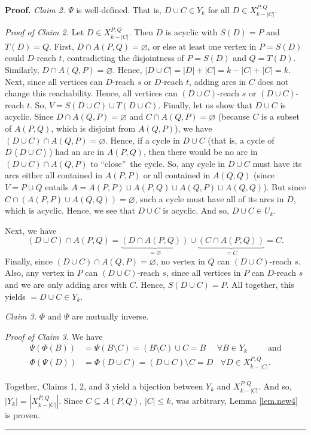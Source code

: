 \documentclass[numbers=enddot,12pt,final,onecolumn,notitlepage]{scrartcl}%
\theoremstyle{definition}
\newenvironment{proof}[1][Proof]{\noindent\textbf{#1.} }{\ \rule{0.5em}{0.5em}}
\theoremstyle{plainsl}
\begin{document}
\begin{proof}
\bigskip
\textit{Claim 2.} $\Psi$ is well-defined. That is, $D \cup C \in Y_{k}$ for all $D \in X_{k-|C|}^{P,Q}$.

\smallskip
\textit{Proof of Claim 2.} Let $D \in X_{k-|C|}^{P,Q}$. Then $D$ is acyclic with $S(D) = P$ and $T(D) = Q$.  First, $D \cap A(P,Q) = \varnothing$, or else at least one vertex in $P = S(D)$ could $D$-reach $t$, contradicting the disjointness of $P = S(D)$ and $Q = T(D)$. Similarly, $D \cap A(Q,P) = \varnothing$. Hence, $|D \cup C| = |D| + |C| = k-|C|+|C| = k$. Next, since all vertices can $D$-reach $s$ or $D$-reach $t$, adding arcs in $C$ does not change this reachability. Hence, all vertices can $(D \cup C)$-reach $s$ or $(D \cup C)$-reach $t$. So, $V = S(D \cup C) \cup T(D \cup C)$. Finally, let us show that $D \cup C$ is acyclic. Since $D \cap A(Q,P) = \varnothing$ and $C \cap A(Q,P) = \varnothing$ (because $C$ is a subset of $A(P,Q)$, which is disjoint from $A(Q,P)$), we have $(D \cup C) \cap A(Q,P) = \varnothing$.
Hence, if a cycle in $D \cup C$ (that is, a cycle of $D\left<D\cup C\right>$) had an arc in $A(P,Q)$, then there would be no arc in $(D \cup C) \cap A(Q,P)$ to ``close''\ the cycle. 
So, any cycle in $D \cup C$ must have its arcs either all contained in $A(P,P)$ or all contained in $A(Q,Q)$ (since $V = P \sqcup Q$ entails $A = A(P,P) \sqcup A(P,Q) \sqcup A(Q,P) \sqcup A(Q,Q)$). But since $C \cap (A(P,P) \cup A(Q,Q)) = \varnothing$, such a cycle must have all of its arcs in $D$, which is acyclic. Hence, we see that $D \cup C$ is acyclic. And so, $D \cup C \in U_{k}$.

Next, we have \begin{equation*}
    (D \cup C) \cap A(P,Q) = \underbrace{(D \cap A(P,Q))}_{=\varnothing} \cup \underbrace{(C \cap A(P,Q))}_{=C} = C.
\end{equation*} Finally, since $(D \cup C) \cap A(Q,P) = \varnothing$, no vertex in $Q$ can $(D \cup C)$-reach $s$. Also, any vertex in $P$ can $(D \cup C)$-reach $s$, since all vertices in $P$ can $D$-reach $s$ and we are only adding arcs with $C$. Hence, $S(D\cup C)= P$. All together, this yields $= D \cup C \in Y_{k}$.

\bigskip
\textit{Claim 3.} $\Phi$ and $\Psi$ are mutually inverse.

\smallskip
\textit{Proof of Claim 3.} We have \begin{align*}
    \Psi(\Phi(B)) &= \Psi(B \setminus C) = (B \setminus C) \cup C = B \ \ \ \ \ \  \forall B \in Y_{k} \ \ \ \ \ \ \ \ \ \ \ \text{and} \\
    \Phi(\Psi(D)) &= \Phi(D \cup C) = (D \cup C) \setminus C = D \ \ \ \ \forall D \in X_{k-|C|}^{P,Q}.
\end{align*}

\bigskip
Together, Claims 1, 2, and 3 yield a bijection between $Y_{k}$ and $X_{k-|C|}^{P,Q}$. And so, $|Y_{k}| = |X_{k-|C|}^{P,Q}|$. Since $C \subseteq A(P,Q)$, $|C| \leq k$, was arbitrary, Lemma \ref{lem.new4} is proven.
\end{proof}
\end{document}
